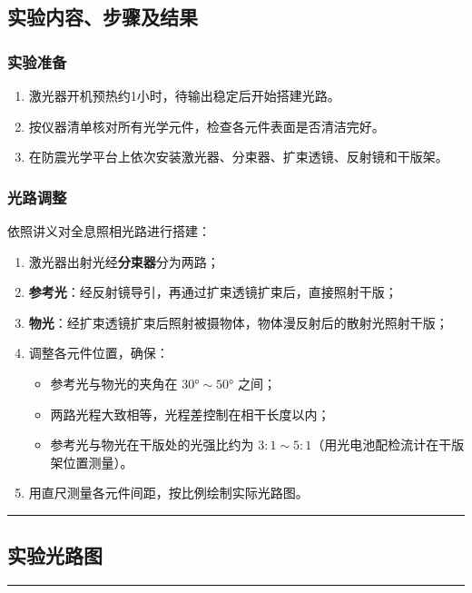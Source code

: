 \documentclass[dvipsnames, svgnames,a4paper,11pt]{article}
\newcommand{\recordblank}[1]{%
  \par\noindent\rule{0.95\linewidth}{0pt}\rule{0pt}{#1}\par}
\begin{document}

\subsection{实验内容、步骤及结果}

\subsubsection{实验准备}
\begin{enumerate}
	\item 激光器开机预热约1小时，待输出稳定后开始搭建光路。
	\item 按仪器清单核对所有光学元件，检查各元件表面是否清洁完好。
	\item 在防震光学平台上依次安装激光器、分束器、扩束透镜、反射镜和干版架。
\end{enumerate}

\subsubsection{光路调整}

依照讲义对全息照相光路进行搭建：

\begin{enumerate}
	\item 激光器出射光经\textbf{分束器}分为两路；
	\item \textbf{参考光}：经反射镜导引，再通过扩束透镜扩束后，直接照射干版；
	\item \textbf{物光}：经扩束透镜扩束后照射被摄物体，物体漫反射后的散射光照射干版；
	\item 调整各元件位置，确保：
	\begin{itemize}
		\item 参考光与物光的夹角在 $30°\sim50°$ 之间；
		\item 两路光程大致相等，光程差控制在相干长度以内；
		\item 参考光与物光在干版处的光强比约为 $3:1\sim5:1$（用光电池配检流计在干版架位置测量）。
	\end{itemize}
	\item 用直尺测量各元件间距，按比例绘制实际光路图。
\end{enumerate}
\recordblank{5cm}

\subsection{实验光路图}

\recordblank{5cm}
\end{document}
